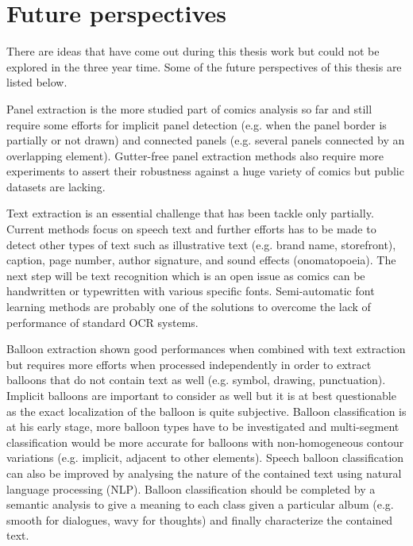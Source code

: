 \section{Future perspectives}
\label{conclusions:perspectives}

There are ideas that have come out during this thesis work but could not be explored in the three year time.
Some of the future perspectives of this thesis are listed below.

Panel extraction is the more studied part of comics analysis so far and still require some efforts for implicit panel detection (e.g. when the panel border is partially or not drawn) and connected panels (e.g. several panels connected by an overlapping element).
Gutter-free panel extraction methods also require more experiments to assert their robustness against a huge variety of comics but public datasets are lacking.

Text extraction is an essential challenge that has been tackle only partially.
Current methods focus on speech text and further efforts has to be made to detect other types of text such as illustrative text (e.g. brand name, storefront), caption, page number, author signature, and sound effects (onomatopoeia).
The next step will be text recognition which is an open issue as comics can be handwritten or typewritten with various specific fonts.
Semi-automatic font learning methods are probably one of the solutions to overcome the lack of performance of standard OCR systems. 

Balloon extraction shown good performances when combined with text extraction but requires more efforts when processed independently in order to extract balloons that do not contain text as well (e.g. symbol, drawing, punctuation).
Implicit balloons are important to consider as well but it is at best questionable as the exact localization of the balloon is quite subjective.
Balloon classification is at his early stage, more balloon types have to be investigated and multi-segment classification would be more accurate for balloons with non-homogeneous contour variations (e.g. implicit, adjacent to other elements). 
Speech balloon classification can also be improved by analysing the nature of the contained text using natural language processing (NLP).
Balloon classification should be completed by a semantic analysis to give a meaning to each class given a particular album (e.g. smooth for dialogues, wavy for thoughts) and finally characterize the contained text.

